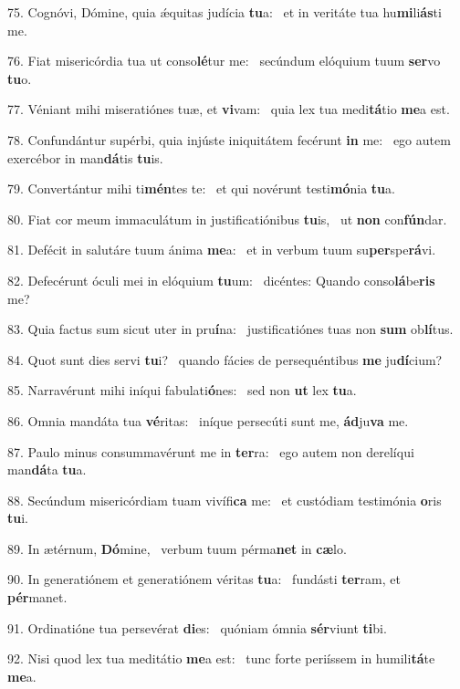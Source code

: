 75. Cognóvi, Dómine, quia ǽquitas judícia \textbf{tu}a: \ast\  et in veritáte tua hu\textbf{mi}li\textbf{ás}ti me.\

76. Fiat misericórdia tua ut conso\textbf{lé}tur me: \ast\  secúndum elóquium tuum \textbf{ser}vo \textbf{tu}o.\

77. Véniant mihi miseratiónes tuæ, et \textbf{vi}vam: \ast\  quia lex tua medi\textbf{tá}tio \textbf{me}a est.\

78. Confundántur supérbi, quia injúste iniquitátem fecérunt \textbf{in} me: \ast\  ego autem exercébor in man\textbf{dá}tis \textbf{tu}is.\

79. Convertántur mihi ti\textbf{mén}tes te: \ast\  et qui novérunt testi\textbf{mó}nia \textbf{tu}a.\

80. Fiat cor meum immaculátum in justificatiónibus \textbf{tu}is, \ast\  ut \textbf{non} con\textbf{fún}dar.\

81. Defécit in salutáre tuum ánima \textbf{me}a: \ast\  et in verbum tuum su\textbf{per}spe\textbf{rá}vi.\

82. Defecérunt óculi mei in elóquium \textbf{tu}um: \ast\  dicéntes: Quando conso\textbf{lá}be\textbf{ris} me?\

83. Quia factus sum sicut uter in pru\textbf{í}na: \ast\  justificatiónes tuas non \textbf{sum} ob\textbf{lí}tus.\

84. Quot sunt dies servi \textbf{tu}i? \ast\  quando fácies de persequéntibus \textbf{me} ju\textbf{dí}cium?\

85. Narravérunt mihi iníqui fabulati\textbf{ó}nes: \ast\  sed non \textbf{ut} lex \textbf{tu}a.\

86. Omnia mandáta tua \textbf{vé}ritas: \ast\  iníque persecúti sunt me, \textbf{ád}ju\textbf{va} me.\

87. Paulo minus consummavérunt me in \textbf{ter}ra: \ast\  ego autem non derelíqui man\textbf{dá}ta \textbf{tu}a.\

88. Secúndum misericórdiam tuam vivífi\textbf{ca} me: \ast\  et custódiam testimónia \textbf{o}ris \textbf{tu}i.\

89. In ætérnum, \textbf{Dó}mine, \ast\  verbum tuum pérma\textbf{net} in \textbf{cæ}lo.\

90. In generatiónem et generatiónem véritas \textbf{tu}a: \ast\  fundásti \textbf{ter}ram, et \textbf{pér}manet.\

91. Ordinatióne tua persevérat \textbf{di}es: \ast\  quóniam ómnia \textbf{sér}viunt \textbf{ti}bi.\

92. Nisi quod lex tua meditátio \textbf{me}a est: \ast\  tunc forte periíssem in humili\textbf{tá}te \textbf{me}a.\

